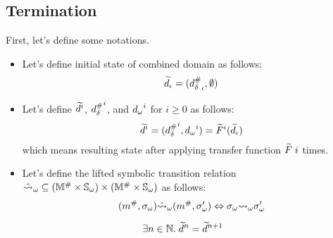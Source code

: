 \subsection{Termination}

First, let's define some notations.

\begin{itemize}
\item
Let's define initial state of combined domain as follows:
\[
  \widetilde{d}_\iota = ({{d}^{\#}_\delta}_\iota, \emptyset)
\]
\item
Let's define $\widetilde{d}^i$, ${{d}^{\#}_\delta}^i$, and ${{d}_\omega}^i$ for $i \geq 0$ as follows:
\[
  \widetilde{d}^i = ({{d}^{\#}_\delta}^i, {{d}_\omega}^i) = \widetilde{F}^i(\widetilde{d}_\iota)
\]
which means resulting state after applying transfer function $\widetilde{F} \; i$ times.
\item
Let's define the lifted symbolic transition relation
$\hat{\leadsto}_\omega \subseteq
({\mathbb{M}}^{\#} \times {\mathbb{S}}_\omega) \times ({\mathbb{M}}^{\#} \times {\mathbb{S}}_\omega)$
as follows:
\[
  ({m}^{\#}, {\sigma}_\omega) \hat{\leadsto}_\omega ({m}^{\#}, {\sigma}_\omega') \Leftrightarrow
  {\sigma}_\omega {\leadsto}_\omega {\sigma}_\omega'
\]
\end{itemize}

\begin{theorem}[Termination]\label{theorem:termination}
  \[
    \exists n \in \mathbb{N}. \; \widetilde{d}^n = \widetilde{d}^{n+1}
  \]
\end{theorem}

